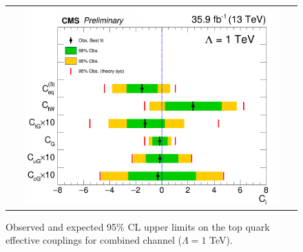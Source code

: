 \begin{figure}[h]
  \begin{center}
    \begin{tabular}{c}
      \includegraphics[width=0.9\textwidth]{figures/tW/fig/Result/tW_limit.png}\\
    \end{tabular}
    \caption{Observed and expected 95\% CL upper limits on the top quark effective couplings for combined channel ($\Lambda=1$ TeV).}
    \label{fin}
  \end{center}
\end{figure}





